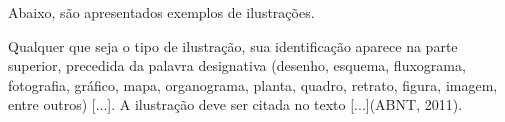 \documentclass[
  oneside, %
  english,
  brazil
]{abntbibufjf}
\begin{document}





Abaixo, são apresentados exemplos de ilustrações.

Qualquer que seja o tipo de ilustração, sua identificação aparece na parte superior, precedida da palavra designativa (desenho, esquema, fluxograma, fotografia, gráfico, mapa, organograma, planta, quadro, retrato, figura, imagem, entre outros) [...].
A ilustração deve ser citada no texto [...](ABNT, 2011).










\end{document}

